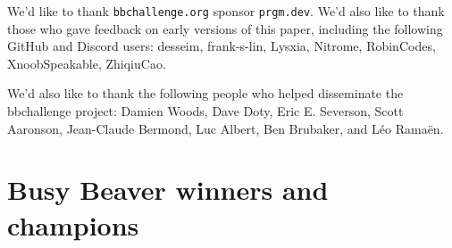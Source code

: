 \documentclass[a4paper,british]{article}
\theoremstyle{definition} %
\numberwithin{equation}{section}
\theoremstyle{definition} %
\begin{document}
We'd like to thank \texttt{bbchallenge.org} sponsor \texttt{prgm.dev}. We'd also like to thank those who gave feedback on early versions of this paper, including the following GitHub and Discord users: desseim, frank-s-lin, Lysxia, Nitrome, RobinCodes, XnoobSpeakable, ZhiqiuCao.

We'd also like to thank the following people who helped disseminate the bbchallenge project: Damien Woods, Dave Doty, Eric E. Severson, Scott Aaronson, Jean-Claude Bermond, Luc Albert, Ben Brubaker, and Léo Ramaën.

\begingroup
\renewcommand\thefootnote{$\ast$}
\endgroup

\newpage

\vspace*{-5em}
\section{Busy Beaver winners and champions}\label{app:lowerbounds}
\end{document}
